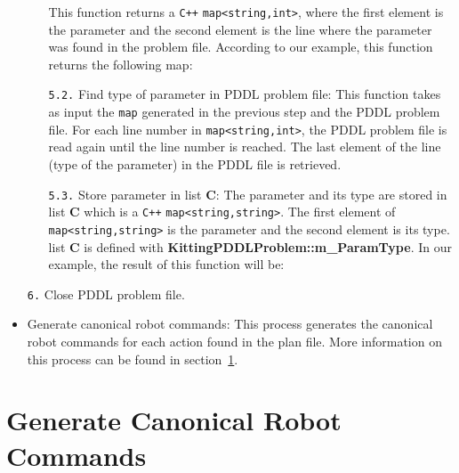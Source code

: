 \begin{itemize}
\begin{itemize}
This function returns a \verb!C++! \texttt{map<string,int>}, where the first element is the parameter and the second element is the line where the parameter was found in the problem file. According to our example, this function returns the following map:\\
\small{}
\item[\texttt{5.2.}] Find type of parameter in PDDL problem file: This function takes as input the \texttt{map} generated in the previous step and the PDDL problem file. For each line number in \texttt{map<string,int>}, the PDDL problem file is read again until the line number is reached. The last element of the line (type of the parameter) in the PDDL file is retrieved.
\item[\texttt{5.3.}] Store parameter in list \textbf{C}: The parameter and its type are stored in list \textbf{C} which is a \verb!C++! \texttt{map<string,string>}. The first element of \texttt{map<string,string>} is the parameter and the second element is its type. list \textbf{C} is defined with \textbf{\footnotesize{KittingPDDLProblem::m\_ParamType}}. In our example, the result of this function will be:\\
    \small{}
\end{itemize}
\item[\texttt{6.}] Close PDDL problem file.
\item Generate canonical robot commands: This process generates the canonical robot commands for each action found in the plan file. More information on this process can be found in section~\ref{robotcommands}.

\end{itemize}



\newpage
\section{Generate Canonical Robot Commands}\label{robotcommands}

